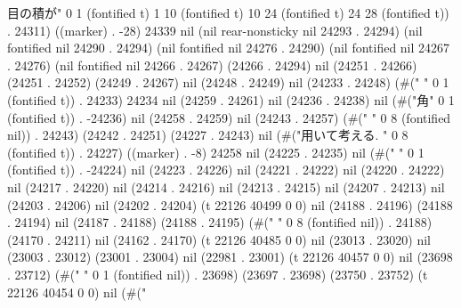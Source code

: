               目の積が" 0 1 (fontified t) 1 10 (fontified t) 10 24 (fontified t) 24 28 (fontified t)) . 24311) ((marker) . -28) 24339 nil (nil rear-nonsticky nil 24293 . 24294) (nil fontified nil 24290 . 24294) (nil fontified nil 24276 . 24290) (nil fontified nil 24267 . 24276) (nil fontified nil 24266 . 24267) (24266 . 24294) nil (24251 . 24266) (24251 . 24252) (24249 . 24267) nil (24248 . 24249) nil (24233 . 24248) (#(" " 0 1 (fontified t)) . 24233) 24234 nil (24259 . 24261) nil (24236 . 24238) nil (#("角" 0 1 (fontified t)) . -24236) nil (24258 . 24259) nil (24243 . 24257) (#("        " 0 8 (fontified nil)) . 24243) (24242 . 24251) (24227 . 24243) nil (#("用いて考える. " 0 8 (fontified t)) . 24227) ((marker) . -8) 24258 nil (24225 . 24235) nil (#(" " 0 1 (fontified t)) . -24224) nil (24223 . 24226) nil (24221 . 24222) nil (24220 . 24222) nil (24217 . 24220) nil (24214 . 24216) nil (24213 . 24215) nil (24207 . 24213) nil (24203 . 24206) nil (24202 . 24204) (t 22126 40499 0 0) nil (24188 . 24196) (24188 . 24194) nil (24187 . 24188) (24188 . 24195) (#("        " 0 8 (fontified nil)) . 24188) (24170 . 24211) nil (24162 . 24170) (t 22126 40485 0 0) nil (23013 . 23020) nil (23003 . 23012) (23001 . 23004) nil (22981 . 23001) (t 22126 40457 0 0) nil (23698 . 23712) (#(" " 0 1 (fontified nil)) . 23698) (23697 . 23698) (23750 . 23752) (t 22126 40454 0 0) nil (#("
